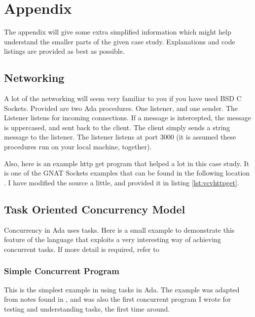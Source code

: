 \section{Appendix}
The appendix will give some extra simplified information which might help understand the smaller parts of the given case study. Explanations and code listings are provided as best as possible.

\subsection{Networking}
A lot of the networking will seem very familiar to you if you have used BSD C Sockets. Provided are two Ada procedures. One listener, and one sender. The Listener listens for incoming connections. If a message is intercepted, the message is uppercased, and sent back to the client. 
The client simply sends a string message to the listener. The listener listens at port 3000 (it is assumed these procedures run on your local machine, together).




Also, here is an example http get program that helped a lot in this case study. It is one of the GNAT Sockets examples that can be found in the following location \cite{AdaGetHttpClient}. I have modified the source a little, and provided it in listing \ref{lst:vcvhttpget}.


\subsection{Task Oriented Concurrency Model}
Concurrency in Ada uses tasks. Here is a small example to demonstrate this feature of the language that exploits a very interesting way of achieving concurrent tasks. If more detail is required, refer to \cite{AdaTasking}

\subsubsection{Simple Concurrent Program}
This is the simplest example in using tasks in Ada. The example was adapted from notes found in \cite{AdaConcurrent}, and was also the first concurrent program I wrote for testing and understanding tasks, the first time around.


